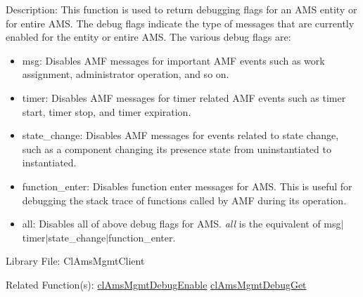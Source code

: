 \begin{Desc}
\item[Description:]This function is used to return debugging flags for an AMS entity or for entire AMS. The debug flags indicate the type of messages that are currently enabled for the entity or entire AMS. The various debug flags are: \begin{itemize}
\item msg: Disables AMF messages for important AMF events such as work assignment, administrator operation, and so on. \item timer: Disables AMF messages for timer related AMF events such as timer start, timer stop, and timer expiration. \item state\_\-change: Disables AMF messages for events related to state change, such as a component changing its presence state from uninstantiated to instantiated. \item function\_\-enter: Disables function enter messages for AMS. This is useful for debugging the stack trace of functions called by AMF during its operation. \item all: Disables all of above debug flags for AMS. {\em all\/} is the equivalent of msg$|$timer$|$state\_\-change$|$function\_\-enter.\end{itemize}
\end{Desc}
\begin{Desc}
\item[Library File:]Cl\-Ams\-Mgmt\-Client\end{Desc}
\begin{Desc}
\item[Related Function(s):]\hyperlink{pageams125}{cl\-Ams\-Mgmt\-Debug\-Enable} \hyperlink{pageams127}{cl\-Ams\-Mgmt\-Debug\-Get} \end{Desc}

\newpage
